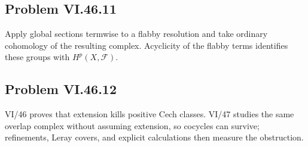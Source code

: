 \subsection*{Problem VI.46.11}
\begin{solution}
Apply global sections termwise to a flabby resolution and take ordinary cohomology of the resulting complex.  Acyclicity of the flabby terms identifies these groups with \(H^p(X,\mathcal F)\).
\end{solution}

\subsection*{Problem VI.46.12}
\begin{solution}
VI/46 proves that extension kills positive Cech classes.  VI/47 studies the same overlap complex without assuming extension, so cocycles can survive; refinements, Leray covers, and explicit calculations then measure the obstruction.
\end{solution}

